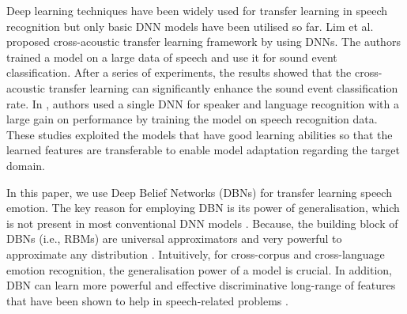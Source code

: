 \documentclass[a4paper]{article}
\newcommand*{\JE}[1]{\textcolor{magenta}{#1}}
\begin{document}
 Deep learning techniques have been widely used for transfer learning in speech recognition but only basic DNN models have been utilised so far. Lim et al. \cite{lim2016cross} proposed cross-acoustic transfer learning framework by using DNNs. The authors trained a model on a large data of speech and use it for sound event classification. After a series of experiments, the results showed that the cross-acoustic transfer learning can significantly enhance the sound event classification rate. In \cite{richardson2015deep}, authors used a single DNN for speaker and language recognition with a large gain on performance by training the model on speech recognition data. 
 These studies exploited the models that have good learning abilities so that the learned features are transferable to enable model adaptation regarding the target domain. 
 
 

In this paper, we use Deep Belief Networks (DBNs) for transfer learning  speech emotion. The key reason for employing DBN is its power of generalisation, which is not present in most conventional DNN models \cite{lee2010unsupervised}. Because, the building block of DBNs (i.e., RBMs) are universal approximators and very powerful to approximate any distribution \cite{le2008representational}.
Intuitively, for cross-corpus and cross-language emotion recognition, the generalisation power of a model is crucial. In addition, DBN can learn more powerful and effective discriminative long-range of features \cite{hinton2006reducing} that have been shown to help in speech-related problems \cite{deng2010binary}.

\end{document}
